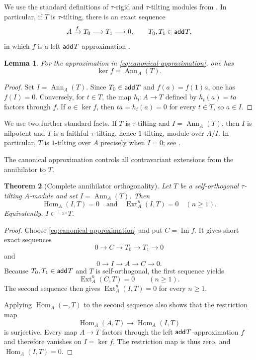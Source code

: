 \documentclass[a4paper,reqno]{amsart}
\newtheorem{theorem}{Theorem}[section]
\newtheorem{lemma}[theorem]{Lemma}
\theoremstyle{definition}
\newcommand{\Ext}{\operatorname{Ext}\nolimits}
\newcommand{\Hom}{\operatorname{Hom}\nolimits}
\newcommand{\Ann}{\operatorname{Ann}\nolimits}
\newcommand{\add}{\mathsf{add}\hspace{.01in}}
\newcommand{\perpall}[1]{{}^{\perp_{\geq 0}}#1}
\numberwithin{equation}{section}
\begin{document}
We use the standard definitions of $\tau$-rigid and $\tau$-tilting
modules from \cite{AIR}.  In particular, if $T$ is $\tau$-tilting,
there is an exact sequence
\begin{equation}\label{eq:canonical-approximation}
 A\xrightarrow{f}T_0\longrightarrow T_1\longrightarrow0,
 \qquad T_0,T_1\in\add T,
\end{equation}
in which $f$ is a left $\add T$-approximation
\cite[Proposition~2.23]{AIR}.

\begin{lemma}\label{lem:kernel}
For the approximation in \eqref{eq:canonical-approximation}, one has
\[
                         \ker f=\Ann_A(T).
\]
\end{lemma}

\begin{proof}
Set $I=\Ann_A(T)$.  Since $T_0\in\add T$ and
$f(a)=f(1)a$, one has $f(I)=0$. Conversely, for $t\in T$, the map
$h_t:A\to T$ defined by $h_t(a)=ta$ factors through $f$.  If
$a\in\ker f$, then $ta=h_t(a)=0$ for every $t\in T$, so $a\in I$.
\end{proof}

We use two further standard facts. If $T$ is $\tau$-tilting and
$I=\Ann_A(T)$, then $I$ is nilpotent and $T$ is a faithful
$\tau$-tilting, hence $1$-tilting, module over $A/I$. In particular,
$T$ is $1$-tilting over $A$ precisely when $I=0$; see
\cite[Lemma~2.4 and Proposition~2.5]{CLZZ}.

The canonical approximation controls all contravariant extensions
from the annihilator to $T$.

\begin{theorem}[Complete annihilator orthogonality]
\label{thm:orthogonality}
Let $T$ be a self-orthogonal $\tau$-tilting $A$-module and set
$I=\Ann_A(T)$.  Then
\[
              \Hom_A(I,T)=0
              \quad\text{and}\quad
              \Ext_A^n(I,T)=0\quad(n\geq1).
\]
Equivalently, $I\in\perpall{T}$.
\end{theorem}

\begin{proof}
Choose \eqref{eq:canonical-approximation} and put
$C=\operatorname{Im}f$.  It gives short exact sequences
\[
 0\longrightarrow C\longrightarrow T_0\longrightarrow T_1
 \longrightarrow0
\]
and
\[
 0\longrightarrow I\longrightarrow A\longrightarrow C
 \longrightarrow0.
\]
Because $T_0,T_1\in\add T$ and $T$ is self-orthogonal, the first
sequence yields
\[
                    \Ext_A^n(C,T)=0\qquad(n\geq1).
\]
The second sequence then gives $\Ext_A^n(I,T)=0$ for every $n\geq1$.

Applying $\Hom_A(-,T)$ to the second sequence also shows that the
restriction map
\[
                 \Hom_A(A,T)\longrightarrow\Hom_A(I,T)
\]
is surjective. Every map $A\to T$ factors through the left
$\add T$-approximation $f$ and therefore vanishes on $I=\ker f$.
The restriction map is thus zero, and $\Hom_A(I,T)=0$.
\end{proof}
\end{document}
